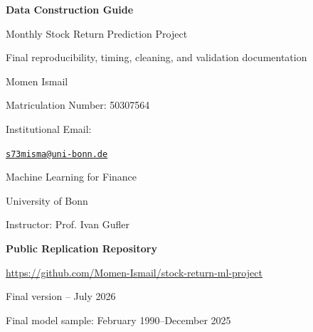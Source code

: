 \documentclass[11pt,a4paper]{article}
\begin{document}
\hypersetup{pageanchor=false}


\begin{titlepage}
\centering

\vspace*{2.1cm}

{\Huge\bfseries\color{navy}
Data Construction Guide
\par}

\vspace{0.45cm}

{\Large
Monthly Stock Return Prediction Project
\par}

\vspace{1.0cm}

{\large
Final reproducibility, timing, cleaning, and validation documentation
\par}

\vfill

{\large
Momen Ismail\par
}

\vspace{0.2cm}

{\large
Matriculation Number: 50307564\par
}

\vspace{0.2cm}

{\large
Institutional Email:\par
\href{mailto:s73misma@uni-bonn.de}
{\texttt{s73misma@uni-bonn.de}}
\par}

\vspace{0.8cm}

{\large
Machine Learning for Finance\par
University of Bonn\par
Instructor: Prof. Ivan Gufler
\par}

\vfill

{\large\bfseries
Public Replication Repository
\par}

\vspace{0.25cm}

\url{https://github.com/Momen-Ismail/stock-return-ml-project}

\vfill

{\small
Final version -- July 2026
\par}

\vspace{0.1cm}

{\small
Final model sample: February 1990--December 2025
\par}

\end{titlepage}
\end{document}
